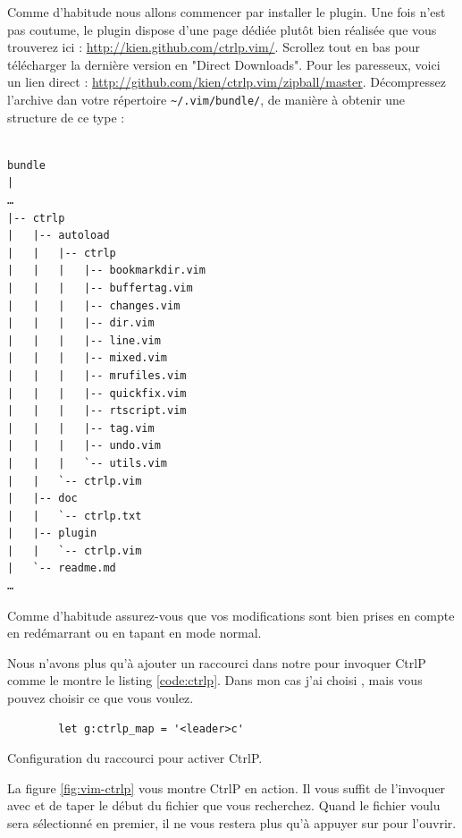 Comme d'habitude nous allons commencer par installer le plugin. Une fois n'est pas coutume, le plugin dispose d'une page dédiée plutôt bien réalisée que vous trouverez ici : \url{http://kien.github.com/ctrlp.vim/}. Scrollez tout en bas pour télécharger la dernière version en "Direct Downloads". Pour les paresseux, voici un lien direct : \url{http://github.com/kien/ctrlp.vim/zipball/master}. Décompressez l'archive dan votre répertoire \Verb|~/.vim/bundle/|, de manière à obtenir une structure de ce type :

\begin{verbatim}

bundle
|
…
|-- ctrlp
|   |-- autoload
|   |   |-- ctrlp
|   |   |   |-- bookmarkdir.vim
|   |   |   |-- buffertag.vim
|   |   |   |-- changes.vim
|   |   |   |-- dir.vim
|   |   |   |-- line.vim
|   |   |   |-- mixed.vim
|   |   |   |-- mrufiles.vim
|   |   |   |-- quickfix.vim
|   |   |   |-- rtscript.vim
|   |   |   |-- tag.vim
|   |   |   |-- undo.vim
|   |   |   `-- utils.vim
|   |   `-- ctrlp.vim
|   |-- doc
|   |   `-- ctrlp.txt
|   |-- plugin
|   |   `-- ctrlp.vim
|   `-- readme.md
…
\end{verbatim}

Comme d'habitude assurez-vous que vos modifications sont bien prises en compte en redémarrant \vim ou en tapant  en mode normal.

Nous n'avons plus qu'à ajouter un raccourci dans notre \vimrc pour invoquer CtrlP comme le montre le listing \ref{code:ctrlp}. Dans mon cas j'ai choisi , mais vous pouvez choisir ce que vous voulez.

\begin{listing}[H]

    \begin{verbatim}
        let g:ctrlp_map = '<leader>c'
    \end{verbatim}
    \caption{Configuration du raccourci pour activer CtrlP.}
    \label{code:ctrlp}
\end{listing}

La figure \ref{fig:vim-ctrlp} vous montre CtrlP en action. Il vous suffit de l'invoquer avec  et de taper le début du fichier que vous recherchez. Quand le fichier voulu sera sélectionné en premier, il ne vous restera plus qu'à appuyer sur \ttenter pour l'ouvrir.

